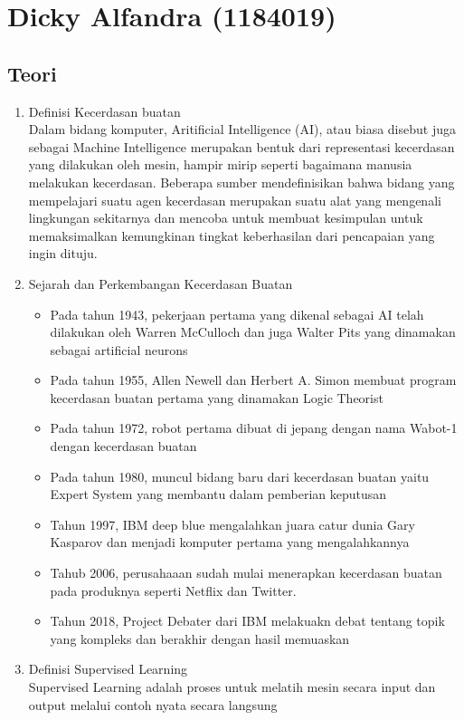 \section{Dicky Alfandra (1184019)}
\subsection{Teori}
\begin{enumerate}
\item Definisi Kecerdasan buatan\\ 
Dalam bidang komputer, Aritificial Intelligence (AI), atau biasa disebut juga sebagai Machine Intelligence merupakan bentuk dari representasi kecerdasan yang dilakukan oleh mesin, hampir mirip seperti bagaimana manusia melakukan kecerdasan. Beberapa sumber mendefinisikan  bahwa bidang yang mempelajari suatu agen kecerdasan merupakan suatu alat yang mengenali lingkungan sekitarnya dan mencoba untuk membuat kesimpulan untuk memaksimalkan kemungkinan tingkat keberhasilan dari pencapaian yang ingin dituju.

\item Sejarah dan Perkembangan Kecerdasan Buatan
\begin{itemize}
\item Pada tahun 1943, pekerjaan pertama yang dikenal sebagai AI telah dilakukan oleh Warren McCulloch dan juga Walter Pits yang dinamakan sebagai artificial neurons
\item Pada tahun 1955, Allen Newell dan Herbert A. Simon membuat program kecerdasan buatan pertama yang dinamakan Logic Theorist
\item Pada tahun 1972, robot pertama dibuat di jepang dengan nama Wabot-1 dengan kecerdasan buatan
\item Pada tahun 1980, muncul bidang baru dari kecerdasan buatan yaitu Expert System yang membantu dalam pemberian keputusan
\item Tahun 1997, IBM deep blue mengalahkan juara catur dunia Gary Kasparov dan menjadi komputer pertama yang mengalahkannya
\item Tahub 2006, perusahaaan sudah mulai menerapkan kecerdasan buatan pada produknya seperti Netflix dan Twitter.
\item Tahun 2018,  	Project Debater dari IBM melakuakn debat tentang topik yang kompleks dan berakhir dengan hasil memuaskan
\end{itemize}

\item Definisi Supervised Learning\\
Supervised Learning adalah proses untuk melatih mesin secara input dan output melalui contoh nyata secara langsung


\end{enumerate}
